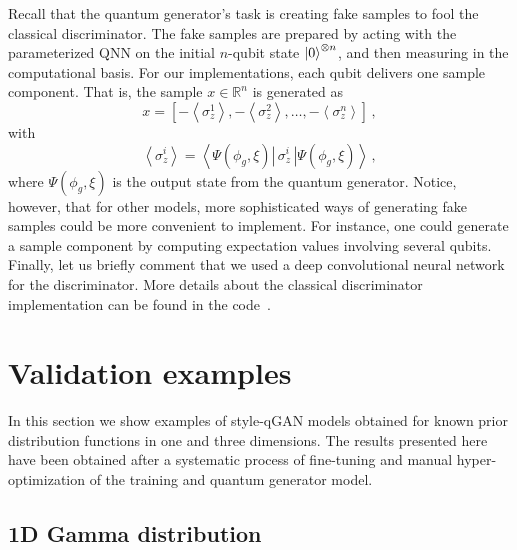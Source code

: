 \documentclass[twocolumn,preprintnumbers,superscriptaddress]{revtex4-2}
\begin{document}
Recall that the quantum generator's task is creating fake samples to fool the classical discriminator. The fake samples are prepared by acting with the parameterized QNN on the initial $n$-qubit state $\ket{0}^{\otimes n}$, and then measuring in the computational basis. For our implementations, each qubit delivers one sample component. That is, the sample $x \in \mathbb{R}^n$ is generated as
\begin{equation}
    \label{eq:samples} x = \left[-\left\langle\sigma_z^1\right\rangle,-\left\langle\sigma_z^2\right\rangle,\hdots,-\left\langle\sigma_z^n\right\rangle\right]\,,
\end{equation}
with
\begin{equation}
    \label{eq:expectation}\left\langle\sigma_z^i\right\rangle = \left\langle\Psi(\phi_g,\xi)\left|\,\sigma_z^i\,\right|\Psi(\phi_g,\xi)\right\rangle \,,
\end{equation}
where $\Psi(\phi_g,\xi)$ is the output state from the quantum generator. Notice, however, that for other models, more sophisticated ways of generating fake samples could be more convenient to implement. For instance, one could generate a sample component by computing expectation values involving several qubits. Finally, let us briefly comment that we used a deep convolutional neural network for the discriminator. More details about the classical discriminator implementation can be found in the code~\cite{cite_code}.

\section{Validation examples}
\label{sec:validation}

In this section we show examples of style-qGAN models obtained for known prior
distribution functions in one and three dimensions. The results presented here
have been obtained after a systematic process of fine-tuning and manual
hyper-optimization of the training and quantum generator model.

\subsection{1D Gamma distribution}
\label{sec:gamma}
\end{document}
